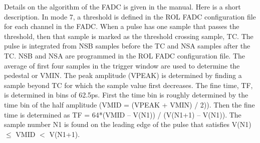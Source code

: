 \documentclass[11pt]{article}
\begin{document}
Details on the algorithm of the FADC is given in the manual. Here is a short description.
In mode 7, a threshold is defined in the ROL FADC  configuration file for each channel in the FADC. When a pulse has one sample that passes the threshold, then that sample is marked
as the threshold crossing sample, TC.  The pulse is integrated from NSB samples before the TC and NSA samples after the TC. NSB and NSA are programmed in the ROL FADC configuration file.
The average of first four samples in the trigger window are used to determine the pedestal or VMIN.
The peak amplitude (VPEAK) is determined by finding a sample beyond TC for which the sample value first decreases.
The fine time, TF,  is determined in bins of 62.5ps. First the time bin is roughly determined by the time bin of the half amplitude (VMID = (VPEAK + VMIN) / 2)).
Then the fine time is determined as TF = 64*(VMID – V(N1)) / (V(N1+1) – V(N1)). The sample number N1 is found on the leading edge of the pulse that satisfies
V(N1) $\leq$ VMID $<$ V(N1+1).
\end{document}
